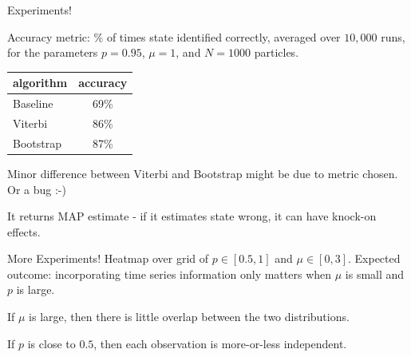 \documentclass[pdf]
{beamer}
\begin{document}
\begin{frame}{Experiments!}

Accuracy metric: \% of times state identified correctly, averaged over $10,000$ runs, for the parameters $ p = 0.95 $, $\mu = 1$, and $N = 1000$ particles.

\vspace{5mm}

\begin{tabular}{ l | c }
  algorithm & accuracy \\
  \hline
  Baseline 	& 69\% \\
  Viterbi 	& 86\% \\
  Bootstrap & 87\% \\
 \end{tabular}

\vspace{5mm}

Minor difference between Viterbi and Bootstrap might be due to metric chosen. Or a bug :-)

It returns MAP estimate - if it estimates state wrong, it can have knock-on effects.

\end{frame}

\begin{frame}{More Experiments!}
Heatmap over grid of $p \in [0.5, 1]$ and $\mu \in [0, 3]$.
Expected outcome: incorporating time series information only matters when $\mu$ is small and $p$ is large.

If $\mu$ is large, then there is little overlap between the two distributions.

If $p$ is close to $0.5$, then each observation is more-or-less independent.
\end{frame}
\end{document}
